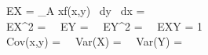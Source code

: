 EX = \iint\limits_A xf(x,y) \ dy \ dx =  \\
EX^2 =  \ \  EY = \ \  EY^2 = \ \  EXY = 1 \\
Cov(x,y) = \ \ Var(X) = \ \ Var(Y) = 